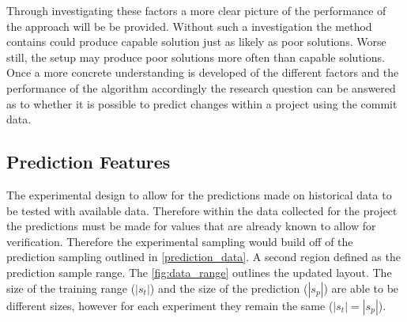 Through investigating these factors a more clear picture of the performance of the approach will be be provided. Without such a investigation the method contains could produce capable solution just as likely as poor solutions. Worse still, the setup may produce poor solutions more often than capable solutions. Once a more concrete understanding is developed of the different factors and the performance of the algorithm accordingly the research question can be answered as to whether it is possible to predict changes within a project using the commit data.

\subsection{Prediction Features}










The experimental design to allow for the predictions made on historical data to be tested with available data. Therefore within the data collected for the project the predictions must be made for values that are already known to allow for verification. Therefore the experimental sampling would build off of the prediction sampling outlined in \autoref{prediction_data}. A second region defined as the prediction sample range. The \autoref{fig:data_range} outlines the updated layout. The size of the training range ($|s_t|$) and the size of the prediction ($|s_p|$) are able to be different sizes, however for each experiment they remain the same ($|s_t| = |s_p|$).

